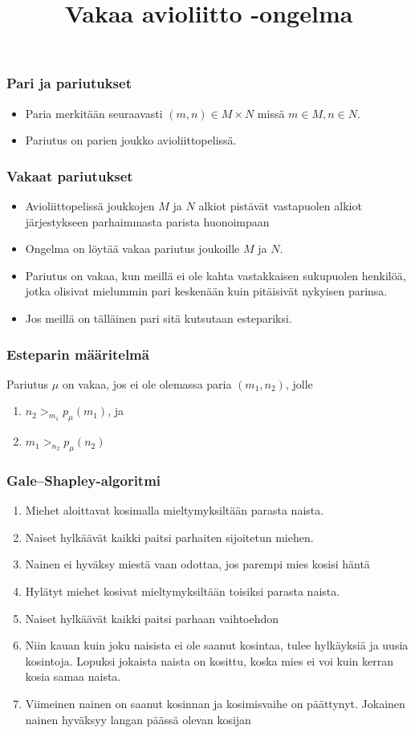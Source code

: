 \documentclass{beamer}
\title{Vakaa avioliitto -ongelma}
\begin{document}
	\frame{\titlepage}
	\begin{frame}
    \frametitle{Pari ja pariutukset}
    \begin{itemize}
		\item Paria merkitään seuraavasti $(m, n) \in M \times N$ missä $m \in M, n \in N$.
		\item  Pariutus on parien joukko avioliittopelissä.
    \end{itemize}
  \end{frame}
  \begin{frame}
    \frametitle{Vakaat pariutukset}
    \begin{itemize}
    	\item Avioliittopelissä joukkojen $M$ ja $N$ alkiot pistävät vastapuolen alkiot järjestykseen parhaimmasta parista huonoimpaan
		\item Ongelma on löytää vakaa pariutus joukoille $M$ ja $N$.
		\item Pariutus on vakaa, kun meillä ei ole kahta vastakkaisen sukupuolen henkilöä, jotka olisivat mielummin pari keskenään kuin pitäisivät nykyisen parinsa.
		\item Jos meillä on tälläinen pari sitä kutsutaan estepariksi. 
    \end{itemize}
  \end{frame}
  \begin {frame}
  	\frametitle{Esteparin määritelmä}
  	Pariutus $\mu$ on vakaa, jos ei ole olemassa paria $(m_{1}, n_{2})$, jolle
  	\begin{enumerate}
  		\item $n_2 >_{m_{1}} p_{\mu}(m_1)$, ja
  		\item $m_1 >_{n_{2}} p_{\mu}(n_2)$
  	\end{enumerate}
  \end{frame}
  \begin{frame}
    \frametitle{Gale--Shapley-algoritmi}
    \begin{enumerate}
	\item Miehet aloittavat kosimalla mieltymyksiltään parasta naista.
	\item Naiset hylkäävät kaikki paitsi parhaiten sijoitetun miehen.
	\item Nainen ei hyväksy miestä vaan odottaa, jos parempi mies kosisi häntä
	\item Hylätyt miehet kosivat mieltymyksiltään toisiksi parasta naista.
	\item Naiset hylkäävät kaikki paitsi parhaan vaihtoehdon
	\item Niin kauan kuin joku naisista ei ole saanut kosintaa, tulee hylkäyksiä ja uusia kosintoja. Lopuksi jokaista naista on kosittu, koska mies ei voi kuin kerran kosia samaa naista.
	\item Viimeinen nainen on saanut kosinnan ja kosimisvaihe on päättynyt. Jokainen nainen hyväksyy langan päässä olevan kosijan
\end{enumerate}
  \end{frame}
\end{document}
